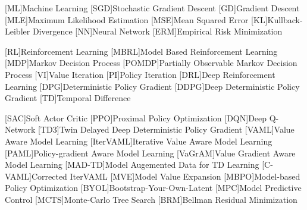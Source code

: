 [ML]{Machine Learning}
[SGD]{Stochastic Gradient Descent}
[GD]{Gradient Descent}
[MLE]{Maximum Likelihood Estimation}
[MSE]{Mean Squared Error}
[KL]{Kullback-Leibler Divergence}
[NN]{Neural Network}
[ERM]{Empirical Risk Minimization}

[RL]{Reinforcement Learning}
[MBRL]{Model Based Reinforcement Learning}
[MDP]{Markov Decision Process}
[POMDP]{Partially Observable Markov Decision Process}
[VI]{Value Iteration}
[PI]{Policy Iteration}
[DRL]{Deep Reinforcement Learning}
[DPG]{Deterministic Policy Gradient}
[DDPG]{Deep Deterministic Policy Gradient}
[TD]{Temporal Difference}

[SAC]{Soft Actor Critic}
[PPO]{Proximal Policy Optimization}
[DQN]{Deep Q-Network}
[TD3]{Twin Delayed Deep Deterministic Policy Gradient}
[VAML]{Value Aware Model Learning}
[IterVAML]{Iterative Value Aware Model Learning}
[PAML]{Policy-gradient Aware Model Learning}
[VaGrAM]{Value Gradient Aware Model Learning}
[MAD-TD]{Model Augemented Data for TD Learning}
[C-VAML]{Corrected IterVAML}
[MVE]{Model Value Expansion}
[MBPO]{Model-based Policy Optimization}
[BYOL]{Bootstrap-Your-Own-Latent}
[MPC]{Model Predictive Control}
[MCTS]{Monte-Carlo Tree Search}
[BRM]{Bellman Residual Minimization}

